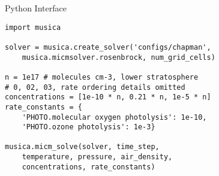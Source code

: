 \vspace{-0.27in}
\begin{block}{Python Interface}
\begin{verbatim}
import musica

solver = musica.create_solver('configs/chapman',
    musica.micmsolver.rosenbrock, num_grid_cells)

n = 1e17 # molecules cm-3, lower stratosphere
# 0, 02, 03, rate ordering details omitted
concentrations = [1e-10 * n, 0.21 * n, 1e-5 * n]
rate_constants = {
    'PHOTO.molecular oxygen photolysis': 1e-10,
    'PHOTO.ozone photolysis': 1e-3}

musica.micm_solve(solver, time_step,
    temperature, pressure, air_density,
    concentrations, rate_constants)
\end{verbatim}
\end{block}
